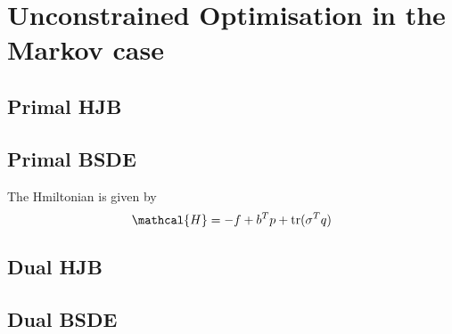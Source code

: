 \section{Unconstrained Optimisation in the Markov case}
\subsection{Primal HJB}
\subsection{Primal BSDE}
The Hmiltonian is given by
\begin{equation}
    \mathcal{H} = - f + b^T p + \tr (\sigma^T q)
\end{equation}
\subsection{Dual HJB}
\subsection{Dual BSDE}